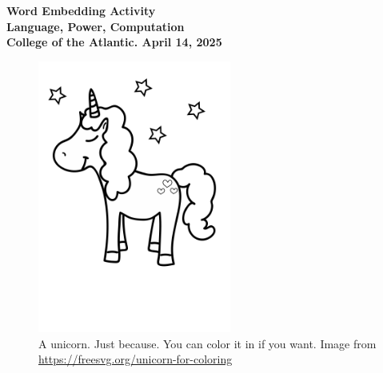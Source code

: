 \documentclass[12pt]{article}
\begin{document}
\pagestyle{empty}
\begin{center}
{\Large {\bf Word Embedding Activity}}\\
\medskip
{\large {\bf Language, Power, Computation}}\\
\medskip
{\bf College of the Atlantic. April 14, 2025}\\
\end{center}

\vspace{-7mm}

\begin{figure}[h]
\begin{center}
\vspace{1mm}
\includegraphics[width=2.5in]{unicorn2.png}
\vspace{-22mm}
\caption{A unicorn. Just because. You can color it in if you want.
  Image from \protect\url{https://freesvg.org/unicorn-for-coloring}} 
\end{center}
\end{figure}

\vspace{-10mm}
\end{document}
